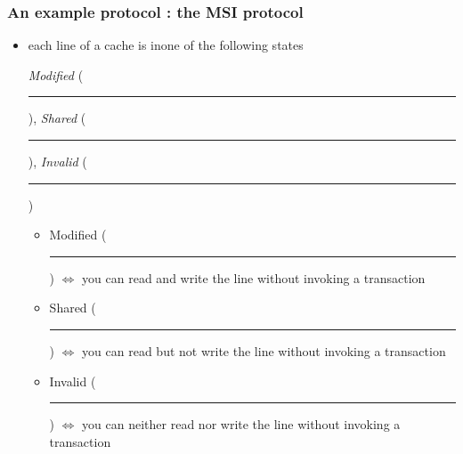 \documentclass[12pt,dvipdfmx]{beamer}
\newcommand{\ao}[1]{{\color{blue}#1}}
\begin{document}
\newcommand{\Mbox}{{\textcolor{green}{\rule{3mm}{4mm}}}}
\newcommand{\Shbox}{{\textcolor{yellow}{\rule{3mm}{2.5mm}}}}
\newcommand{\Ibox}{{\textcolor{red}{\rule{3mm}{1mm}}}}

\begin{frame}
\frametitle{An example protocol : the MSI protocol}
\begin{itemize}
\item<1-> each line of a cache is inone of the following states

  \begin{center}
  {\em Modified} (\Mbox), {\em Shared} (\Shbox), {\em Invalid} (\Ibox)
  \end{center}
  
  \begin{itemize}
  \item<2-> Modified (\Mbox) $\iff$ you can \ao{read and write} the line without invoking a transaction
  \item<2-> Shared (\Shbox) $\iff$ you can \ao{read but not write} the line without invoking a transaction
  \item<2-> Invalid (\Ibox) $\iff$ you can \ao{neither read nor write} the line without invoking a transaction
  \end{itemize}
\end{itemize}
\end{frame}
\end{document}
